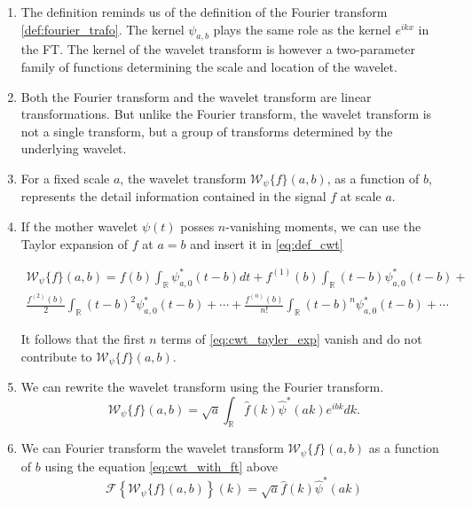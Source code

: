 \begin{enumerate}
    \item The definition reminds us of the definition of the Fourier transform \ref{def:fourier_trafo}. The kernel $\psi_{a, b}$ plays the same role as the kernel $e^{ikx}$
          in the FT. The kernel of the wavelet transform is however a two-parameter family of functions determining the scale and location of the wavelet.
    
    \item Both the Fourier transform and the wavelet transform are linear transformations. But unlike the Fourier transform, the wavelet transform is not a single transform,
          but a group of transforms determined by the underlying wavelet.

    \item For a fixed scale $a$, the wavelet transform $\mathscr{W}_{\psi}\{f\}(a,b)$, as a function of $b$, represents the detail information contained in the signal
          $f$ at scale $a$.
    
    \item If the mother wavelet $\psi(t)$ posses $n$-vanishing moments, we can use the Taylor expansion of $f$ at $a=b$ and insert it in \ref{eq:def_cwt}
    
    \begin{multline}
        \mathscr{W}_{\psi}\{f\}(a,b) = f(b) \int_{\mathbb{R}} \psi_{a, 0}^{\ast}(t-b) dt + f^{(1)}(b)\int_{\mathbb{R}}(t-b) \psi_{a, 0}^{\ast}(t-b) + \\
        \frac{f^{(2)}(b)}{2} \int_{\mathbb{R}}(t-b)^2 \psi_{a, 0}^{\ast}(t-b) + \cdots + \frac{f^{(n)}(b)}{n!} \int_{\mathbb{R}}(t-b)^n \psi_{a, 0}^{\ast}(t-b) + \cdots
        \label{eq:cwt_tayler_exp}
    \end{multline}

    It follows that the first $n$ terms of \ref{eq:cwt_tayler_exp} vanish and do not contribute to $\mathscr{W}_{\psi}\{f\}(a,b)$.

    \item We can rewrite the wavelet transform using the Fourier transform.
    \begin{equation}
        \mathscr{W}_{\psi}\{f\}(a,b) = \sqrt{a} \int_{\mathbb{R}} \hat{f}(k) \hat{\psi}^{\ast}(a k) e^{ibk} dk.
        \label{eq:cwt_with_ft}
    \end{equation}

    \item We can Fourier transform the wavelet transform $\mathscr{W}_{\psi}\{f\}(a,b)$ as a function of $b$ using the equation \ref{eq:cwt_with_ft} above
    \begin{equation}
        \mathscr{F} \left\{ \mathscr{W}_{\psi}\{f\}(a,b)\right\}(k) = \sqrt{a} \hat{f}(k) \hat{\psi}^{\ast}(ak)
        \label{eq:ft_of_cwt}
    \end{equation}
\end{enumerate}

